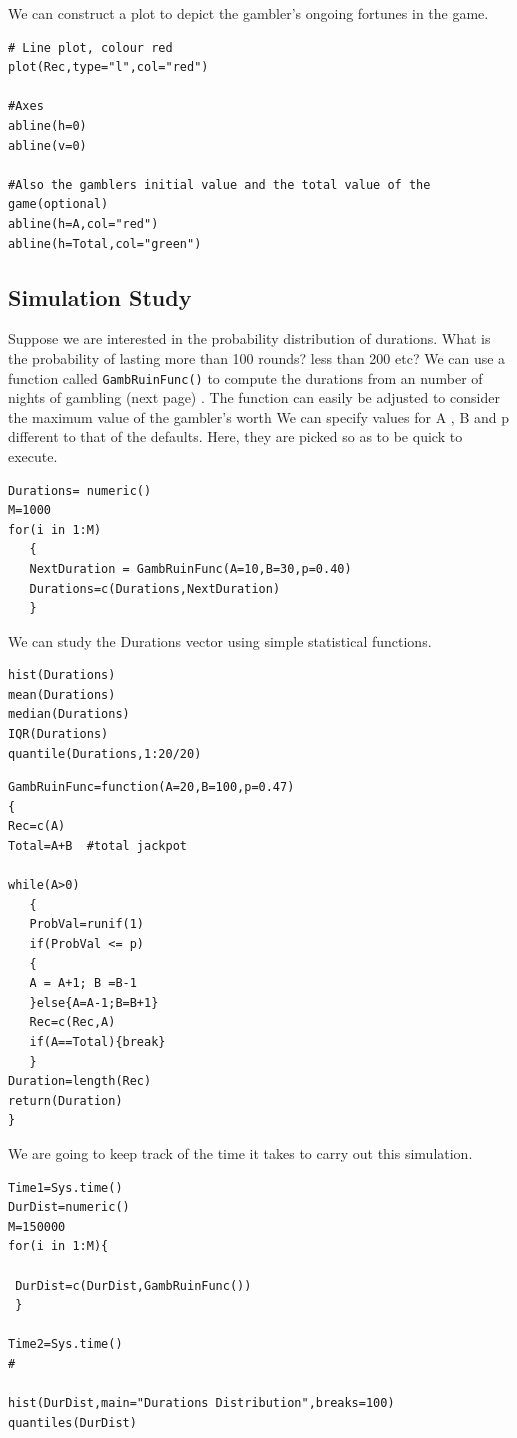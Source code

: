 \documentclass[11pt]{article} %
\begin{document}
We can construct a plot to depict the gambler's ongoing fortunes in the game.
\begin{framed}
\begin{verbatim}
# Line plot, colour red
plot(Rec,type="l",col="red")

#Axes
abline(h=0)
abline(v=0)

#Also the gamblers initial value and the total value of the game(optional)
abline(h=A,col="red")
abline(h=Total,col="green")
\end{verbatim}
\end{framed}
\newpage
\subsection{Simulation Study}
Suppose we are interested in the probability distribution of durations. What is the probability of lasting more than 100 rounds? less than 200 etc? We can use a function called \texttt{GambRuinFunc()} to compute the durations from an number of nights of gambling (next page) . The function can easily be adjusted to consider the maximum value of the gambler's worth
We can specify values for A , B and p different to that of the defaults. Here, they are picked so as to be quick to execute.
\begin{framed}
\begin{verbatim}
Durations= numeric()
M=1000
for(i in 1:M)
   {
   NextDuration = GambRuinFunc(A=10,B=30,p=0.40)
   Durations=c(Durations,NextDuration)
   } 
\end{verbatim}
\end{framed}

We can study the Durations vector  using simple statistical functions.
\begin{framed}
\begin{verbatim}
hist(Durations)
mean(Durations)
median(Durations)
IQR(Durations)
quantile(Durations,1:20/20)
\end{verbatim}
\end{framed}


\newpage
\begin{framed}
\begin{verbatim}
GambRuinFunc=function(A=20,B=100,p=0.47)
{
Rec=c(A)
Total=A+B  #total jackpot

while(A>0)
   { 
   ProbVal=runif(1)
   if(ProbVal <= p)
   {
   A = A+1; B =B-1
   }else{A=A-1;B=B+1}
   Rec=c(Rec,A)
   if(A==Total){break}
   }
Duration=length(Rec)
return(Duration)
}
\end{verbatim}
\end{framed}
We are going to keep track of the time it takes to carry out this simulation.
\begin{framed}
\begin{verbatim}
Time1=Sys.time()
DurDist=numeric()
M=150000
for(i in 1:M){ 

 DurDist=c(DurDist,GambRuinFunc())
 }

Time2=Sys.time()
#

hist(DurDist,main="Durations Distribution",breaks=100)
quantiles(DurDist)
\end{verbatim}
\end{framed}
\newpage
\end{document}

